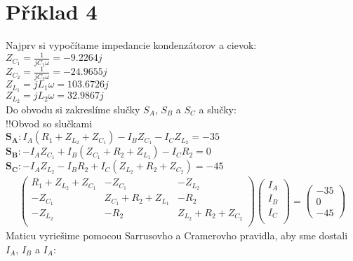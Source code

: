 \section{Příklad 4}
\newline
Najprv si vypočítame impedancie kondenzátorov a cievok: \\
$Z_{C_1} = \frac{1}{jC_1\omega} = -9.2264j$ \\
$Z_{C_2} = \frac{1}{jC_2\omega} = -24.9655j$ \\
$Z_{L_1} = jL_1\omega = 103.6726j$ \\
$Z_{L_2} = jL_2\omega = 32.9867j$ \\
\newline
\newline
Do obvodu si zakreslíme slučky $S_A$, $S_B$ a $S_C$ a slučky: \\
\newline
!!Obvod so slučkami \\
\newline
$\boldsymbol{S_A}: I_A(R_1 + Z_{L_2} + Z_{C_1}) - I_BZ_{C_1} - I_CZ_{L_2} = -35$ \\
$\boldsymbol{S_B}: -I_AZ_{C_1} + I_B(Z_{C_1} + R_2 + Z_{L_1}) - I_CR_2 = 0$ \\
$\boldsymbol{S_C}: -I_AZ_{L_2} - I_BR_2 + I_C(Z_{L_2} + R_2 + Z_{C_2}) = -45$ \\
\newline
\begin{gather*}
\begin{pmatrix}
R_1 + Z_{L_2} + Z_{C_1} & -Z_{C_1} & -Z_{L_2} \\
-Z_{C_1} & Z_{C_1} + R_2 + Z_{L_1} & -R_2 \\
-Z_{L_2} & -R_2 & Z_{L_2} + R_2 + Z_{C_2} \\
\end{pmatrix}
\begin{pmatrix}
I_A \\
I_B \\
I_C \\
\end{pmatrix}
= 
\begin{pmatrix}
-35 \\
0 \\
-45
\end{pmatrix}
\end{gather*}
\newline
Maticu vyriešime pomocou Sarrusovho a Cramerovho pravidla, aby sme dostali $I_A$, $I_B$ a $I_A$: \\

